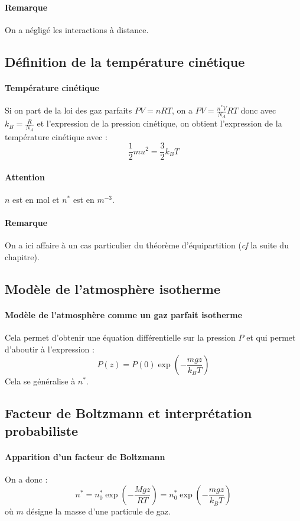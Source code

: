 \documentclass[french]{book}
\theoremstyle{plain}
\theoremstyle{definition}
\theoremstyle{remark}
\newcommand{\st}{^*}
\begin{document}
\paragraph{Remarque} On a négligé les interactions à distance.

\subsection{Définition de la température cinétique}

\paragraph{Température cinétique} Si on part de la loi des gaz parfaits $PV=nRT$, on a $PV=\displaystyle\frac{n\st V}{N_A}RT$ donc avec $k_B=\displaystyle\frac{R}{N_A}$ et l'expression de la pression cinétique, on obtient l'expression de la température cinétique avec : $$\frac{1}{2}mu^2=\frac{3}{2}k_B T$$

\paragraph{Attention} $n$ est en mol et $n\st$ est en $m^{-3}$.

\paragraph{Remarque} On a ici affaire à un cas particulier du théorème d'équipartition (\textit{cf} la suite du chapitre).

\subsection{Modèle de l'atmosphère isotherme}

\paragraph{Modèle de l'atmosphère comme un gaz parfait isotherme} Cela permet d'obtenir une équation différentielle sur la pression $P$ et qui permet d'aboutir à l'expression : $$P(z)=P(0)\exp\left(-\frac{mgz}{k_BT}\right)$$ Cela se généralise à $n\st$.
\subsection{Facteur de Boltzmann et interprétation probabiliste}

\paragraph{Apparition d'un facteur de Boltzmann}
On a donc : $$n\st=n_0\st\exp\left(-\frac{Mgz}{RT}\right)=n_0\st\exp\left(-\frac{mgz}{k_BT}\right)$$ où $m$ désigne la masse d'une particule de gaz.
\end{document}
